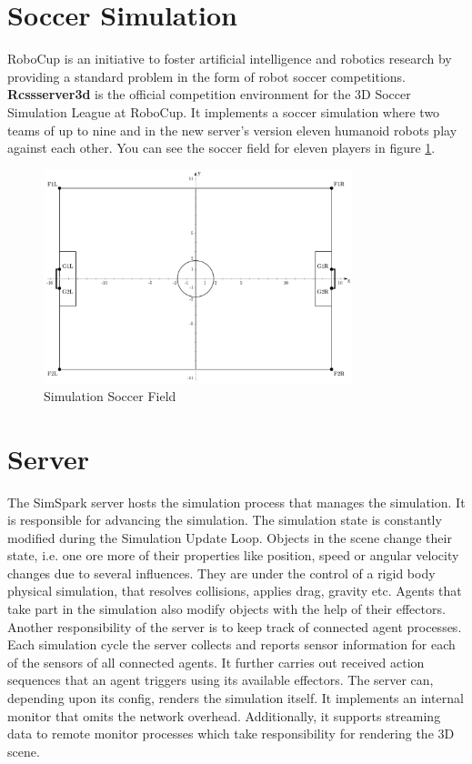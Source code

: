 \section{Soccer Simulation}
RoboCup is an initiative to foster artificial intelligence and robotics research by providing a standard problem in the form of robot soccer competitions. {\bf Rcssserver3d} is the official competition environment for the 3D Soccer Simulation League at RoboCup. It implements a soccer simulation where two teams of up to nine and in the new server's version eleven humanoid robots play against each other. You can see the soccer field for eleven players in figure \ref{fig:SimulationSoccerField}. \cite{SimSpark}
\begin{figure}[ht!]
\centering
  \includegraphics[width=0.8\textwidth]{Chapter2/figures/1280px-SoccerSimulation_FieldPlan.png}
  \caption{Simulation Soccer Field} 
  \label{fig:SimulationSoccerField}
\end{figure}
\section{Server}
The SimSpark server hosts the simulation process that manages the simulation. It is responsible for advancing the simulation. The simulation state is constantly modified during the Simulation Update Loop.
Objects in the scene change their state, i.e. one ore more of their properties like position, speed or angular velocity changes due to several influences. They are under the control of a rigid body physical simulation, that resolves collisions, applies drag, gravity etc. Agents that take part in the simulation also modify objects with the help of their effectors.
Another responsibility of the server is to keep track of connected agent processes. Each simulation cycle the server collects and reports sensor information for each of the sensors of all connected agents. It further carries out received action sequences that an agent triggers using its available effectors.
The server can, depending upon its config, renders the simulation itself. It implements an internal monitor that omits the network overhead. Additionally, it supports streaming data to remote monitor processes which take responsibility for rendering the 3D scene.\cite{SimSpark}


